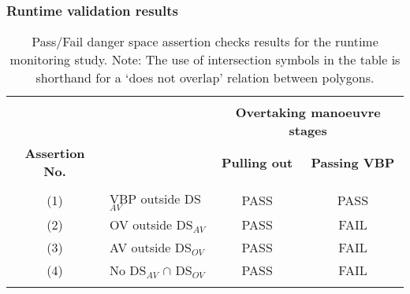 \subsubsection{Runtime validation results}
\begin{table}
	\centering
	\begin{tabular}{ clcc }
		\hline
		\\
		\textbf{} & \multirow{3}{*}{\textbf{}} & \multicolumn{2}{c}{\textbf{Overtaking manoeuvre stages}}\\
		\textbf{Assertion No.} & \textbf{Assertion} & \textbf{Pulling out} & \textbf{Passing VBP} %
		 \\
		&  &  &   \\
		(1) & VBP outside DS$_{AV}$ & PASS & PASS  \\
		(2) & OV outside DS$_{AV}$ & PASS & FAIL  \\
		(3) & AV outside DS$_{OV}$  & PASS & FAIL  \\
		(4) & No DS$_{AV}$ $\cap$ DS$_{OV}$  & PASS & FAIL  \\
		\\
		\hline
	\end{tabular}
	\caption{Pass/Fail danger space assertion checks results for the runtime monitoring study. Note: The use of intersection symbols in the table is shorthand for a `does not overlap' relation between polygons.} \label{Overtaking_DS_table}
\end{table}

